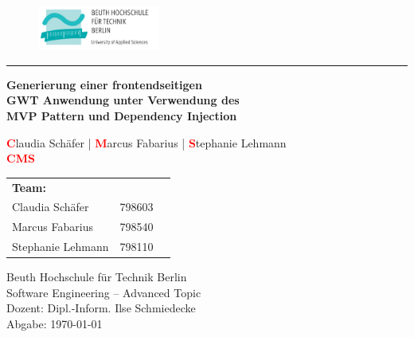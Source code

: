 \begin{titlepage}
\begin{figure}[htp] {
			\hspace{8.0cm} 
			\includegraphics[width=4cm]{./img/logo_beuth.png}\label{fig:beuth_logo}
		} \end{figure}
\vspace{-0.5cm}
\hrule

\vspace{3.0cm} {
  \begin{center}
    \large \textbf{Generierung einer frontendseitigen \\
    			  GWT Anwendung unter Verwendung des\\
    			  MVP Pattern und Dependency Injection}

    \vspace{0.8cm}
    \color{dkgray}
	    \textcolor{red}{\textbf{C}}laudia Schäfer	|
    	\textcolor{red}{\textbf{M}}arcus Fabarius	|
    	\textcolor{red}{\textbf{S}}tephanie Lehmann\\
    \textcolor{red}{\textbf{CMS}}\\
  \end{center}
}
\vspace*{\fill}

\hspace{-0.9cm} 
\begin{tabular}{l l l}
  \textbf{Team:} & \\
  Claudia Schäfer & 798603 \\
  Marcus Fabarius & 798540 \\
  Stephanie Lehmann & 798110 \\
\end{tabular}

\vspace{1.5cm}

\noindent 
Beuth Hochschule für Technik Berlin \\
Software Engineering -- Advanced Topic\\
Dozent: Dipl.-Inform. Ilse Schmiedecke\\
\noindent 
Abgabe: \today

\thispagestyle{empty}
\end{titlepage}
